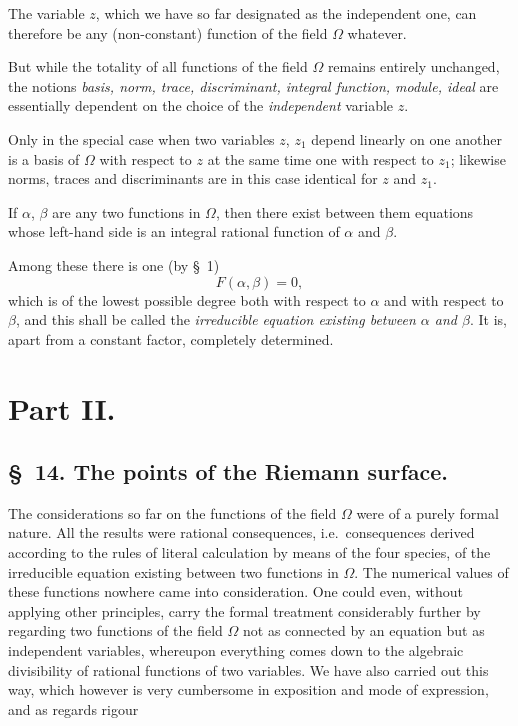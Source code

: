 \documentclass{article}
\begin{document}
The variable $z$, which we have so far designated as the independent one, can therefore be any (non-constant) function of the field $\Omega$ whatever.

But while the totality of all functions of the field $\Omega$ remains entirely unchanged, the notions \emph{basis, norm, trace, discriminant, integral function, module, ideal} are essentially dependent on the choice of the \emph{independent} variable $z$.

Only in the special case when two variables $z$, $z_{1}$ depend linearly on one another is a basis of $\Omega$ with respect to $z$ at the same time one with respect to $z_{1}$; likewise norms, traces and discriminants are in this case identical for $z$ and $z_{1}$.

If $\alpha$, $\beta$ are any two functions in $\Omega$, then there exist between them equations whose left-hand side is an integral rational function of $\alpha$ and $\beta$.

Among these there is one (by §~1)
\[ F(\alpha, \beta) = 0, \]
which is of the lowest possible degree both with respect to $\alpha$ and with respect to $\beta$, and this shall be called the \emph{irreducible equation existing between $\alpha$ and $\beta$}. It is, apart from a constant factor, completely determined.

\section*{Part II.}

\subsection*{§~14. The points of the Riemann surface.}

The considerations so far on the functions of the field $\Omega$ were of a purely formal nature. All the results were rational consequences, i.e.\ consequences derived according to the rules of literal calculation by means of the four species, of the irreducible equation existing between two functions in $\Omega$. The numerical values of these functions nowhere came into consideration. One could even, without applying other principles, carry the formal treatment considerably further by regarding two functions of the field $\Omega$ not as connected by an equation but as independent variables, whereupon everything comes down to the algebraic divisibility of rational functions of two variables. We have also carried out this way, which however is very cumbersome in exposition and mode of expression, and as regards rigour
\end{document}

